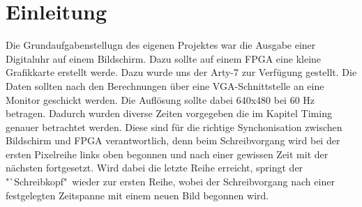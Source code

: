 \documentclass[12pt,a4paper,bibliography=totoc,listof=totoc]{scrartcl}
\begin{document}

\renewcommand{\sectionmark}[1]{\markright{#1}}
\renewcommand{\subsectionmark}[1]{}
\renewcommand{\subsubsectionmark}[1]{}
\rhead{\rightmark}

{}
\renewcommand{\thesection}{\arabic{section}}
\renewcommand{\theHsection}{\arabic{section}}
\setcounter{section}{0}
\setcounter{page}{1}

\section{Einleitung}
Die Grundaufgabenstellugn des eigenen Projektes war die Ausgabe einer Digitaluhr auf einem Bildschirm. Dazu sollte auf einem FPGA eine kleine 
Grafikkarte erstellt werde. Dazu wurde uns der Arty-7 zur Verfügung gestellt. Die Daten sollten nach den Berechnungen über eine VGA-Schnittstelle 
an eine Monitor geschickt werden. 
Die Auflösung sollte dabei 640x480 bei 60 Hz betragen. Dadurch wurden diverse Zeiten vorgegeben die im Kapitel Timing genauer betrachtet werden.
Diese sind für die richtige Synchonisation zwischen Bildschirm und FPGA verantwortlich, denn beim Schreibvorgang wird bei der ersten Pixelreihe links 
oben begonnen und nach einer gewissen Zeit mit der nächsten fortgesetzt. Wird dabei die letzte Reihe erreicht, springt der "`Schreibkopf"\, wieder zur 
ersten Reihe, wobei der Schreibvorgang nach einer festgelegten Zeitspanne mit einem neuen Bild begonnen wird.
\end{document}
